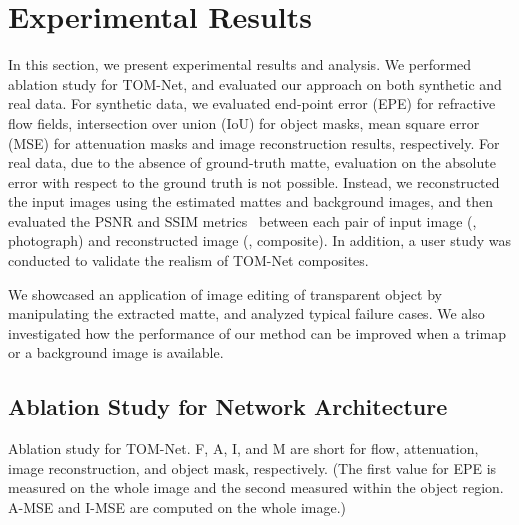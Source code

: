 \section{Experimental Results}
\label{sec:experiments}
In this section, we present experimental results and analysis.
We performed ablation study for TOM-Net, and evaluated our approach on both synthetic and real data.  For synthetic data, we evaluated end-point error (EPE) for refractive flow fields, intersection over union (IoU) for object masks, mean square error (MSE) for attenuation masks and image reconstruction results, respectively.  For real data, due to the absence of ground-truth matte, evaluation on the absolute error with respect to the ground truth is not possible. 
Instead, we reconstructed the input images using the estimated mattes and background images, and then evaluated the PSNR and SSIM metrics~\cite{wang2004image} between each pair of input image (\ie, photograph) and reconstructed image (\ie, composite). In addition, a user study was conducted to validate the realism of TOM-Net composites.

We showcased an application of image editing of transparent object by manipulating the extracted matte, and analyzed typical failure cases. We also investigated how the performance of our method can be improved when a trimap or a background image is available.

\subsection{Ablation Study for Network Architecture}
\label{sub:Network Analysis}

\begin{table} \centering
    \caption[Ablation study for TOM-Net]{Ablation study for TOM-Net. F, A, I, and M are short for flow, attenuation, image reconstruction, and object mask, respectively. (The first value for EPE is measured on the whole image and the second measured within the object region. A-MSE and I-MSE are computed on the whole image.)}
    \label{tab:self_compare}
    
\end{table}

